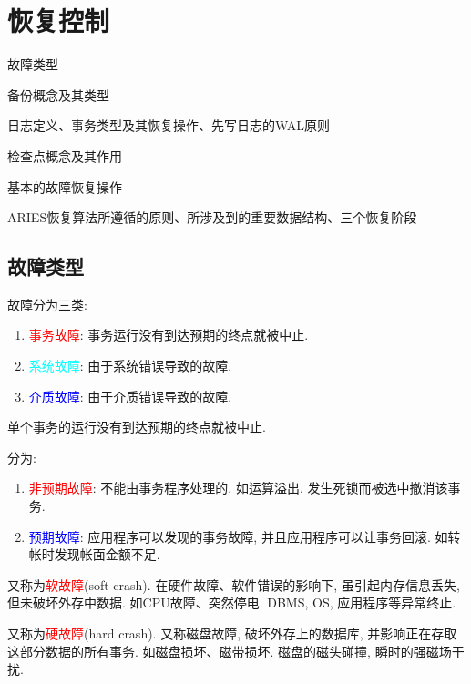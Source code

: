 \chapter{恢复控制}

\begin{introduction}[期末考试复习提纲]
    \item 故障类型
    \item 备份概念及其类型
    \item 日志定义、事务类型及其恢复操作、先写日志的WAL原则
    \item 检查点概念及其作用
    \item 基本的故障恢复操作
    \item ARIES恢复算法所遵循的原则、所涉及到的重要数据结构、三个恢复阶段
\end{introduction}

\section{故障类型}

故障分为三类:
\begin{enumerate}
    \item \textcolor{red}{事务故障}: 事务运行没有到达预期的终点就被中止.
    \item \textcolor{cyan}{系统故障}: 由于系统错误导致的故障.
    \item \textcolor{blue}{介质故障}: 由于介质错误导致的故障.
\end{enumerate}

\begin{definition}[事务故障]
单个事务的运行没有到达预期的终点就被中止.

分为:
\begin{enumerate}
    \item \textcolor{red}{非预期故障}: 不能由事务程序处理的. 如运算溢出, 发生死锁而被选中撤消该事务.
    \item \textcolor{blue}{预期故障}: 应用程序可以发现的事务故障, 并且应用程序可以让事务回滚. 如转帐时发现帐面金额不足.
\end{enumerate}
\end{definition}

\begin{definition}[系统故障]
又称为\textcolor{red}{软故障}(soft crash). 在硬件故障、软件错误的影响下, 虽引起内存信息丢失, 但未破坏外存中数据.
如CPU故障、突然停电. DBMS, OS, 应用程序等异常终止.
\end{definition}

\begin{definition}[介质故障]
又称为\textcolor{red}{硬故障}(hard crash). 又称磁盘故障, 破坏外存上的数据库, 并影响正在存取这部分数据的所有事务.
如磁盘损坏、磁带损坏. 磁盘的磁头碰撞, 瞬时的强磁场干扰.
\end{definition}

